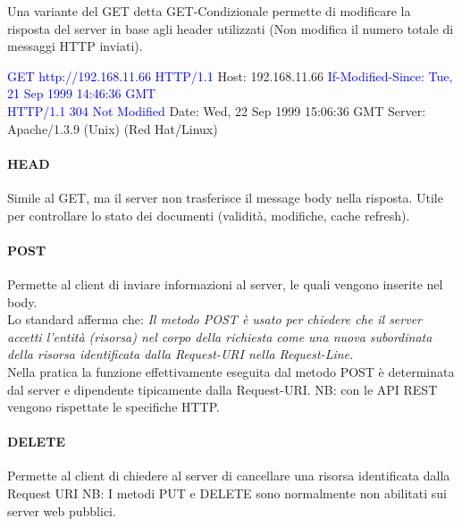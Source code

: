\newpage
Una variante del GET detta GET-Condizionale permette di modificare la risposta del server in base agli header utilizzati (Non modifica il numero totale di messaggi HTTP inviati).
\begin{mdframed}
    \textcolor{blue}{GET http://192.168.11.66 HTTP/1.1}\newline
    Host: 192.168.11.66\newline
    \textcolor{blue}{If-Modified-Since: Tue, 21 Sep 1999 14:46:36 GMT}\newline
    \\
    \textcolor{blue}{HTTP/1.1 304 Not Modified}\newline
    Date: Wed, 22 Sep 1999 15:06:36 GMT\newline
    Server: Apache/1.3.9 (Unix) (Red Hat/Linux)\newline
\end{mdframed}

\paragraph{HEAD}
Simile al GET, ma il server non trasferisce il message body nella risposta.
Utile per controllare lo stato dei documenti (validità, modifiche, cache refresh).

\paragraph{POST} Permette al client di inviare informazioni al server, le quali vengono inserite nel body.\newline
\\
Lo standard afferma che:\newline
\emph{Il metodo POST è usato per chiedere che il server accetti l’entità (risorsa)
nel corpo della richiesta come una nuova subordinata della risorsa
identificata dalla Request-URI nella Request-Line.}
\\
\newline
Nella pratica la funzione effettivamente eseguita dal metodo POST è determinata dal server e dipendente tipicamente dalla Request-URI.
\newline
NB: con le API REST vengono rispettate le specifiche HTTP.

\paragraph{DELETE} Permette al client di chiedere al server di cancellare una risorsa identificata dalla Request URI
\newline NB: I metodi PUT e DELETE sono normalmente non abilitati sui server web pubblici.
